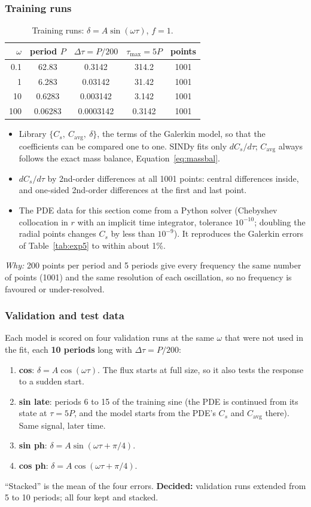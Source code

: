 \documentclass[11pt,a4paper]{article}
\newcommand{\why}{\textit{Why:} }
\newcommand{\decided}[1]{\textcolor{green!40!black}{\textbf{Decided:} #1}}
\newcommand{\avg}{\mathrm{avg}}
\begin{document}
\subsubsection{Training runs}
\begin{table}[H]\centering\small
\begin{tabular}{rcccc}\toprule
$\omega$ & period $P$ & $\Delta\tau=P/200$ & $\tau_{\max}=5P$ & points\\\midrule
0.1 & 62.83 & 0.3142 & 314.2 & 1001\\
1 & 6.283 & 0.03142 & 31.42 & 1001\\
10 & 0.6283 & 0.003142 & 3.142 & 1001\\
100 & 0.06283 & 0.0003142 & 0.3142 & 1001\\\bottomrule
\end{tabular}
\caption{Training runs: $\delta = A\sin(\omega\tau)$, $f=1$.}
\end{table}
\begin{itemize}
  \item Library $\{C_s,\ C_\avg,\ \delta\}$, the terms of the Galerkin model, so that the coefficients can be compared one to one. SINDy fits only $dC_s/d\tau$; $C_\avg$ always follows the exact mass balance, Equation~\eqref{eq:massbal}.
  \item $dC_s/d\tau$ by 2nd-order differences at all 1001 points: central differences inside, and one-sided 2nd-order differences at the first and last point.
  \item The PDE data for this section come from a Python solver (Chebyshev collocation in $r$ with an implicit time integrator, tolerance $10^{-10}$; doubling the radial points changes $C_s$ by less than $10^{-9}$). It reproduces the Galerkin errors of Table~\ref{tab:exp5} to within about 1\%.
\end{itemize}
\why 200 points per period and 5 periods give every frequency the same number of points (1001) and the same resolution of each oscillation, so no frequency is favoured or under-resolved.

\subsubsection{Validation and test data}
Each model is scored on four validation runs at the same $\omega$ that were not used in the fit, each \textbf{10 periods} long with $\Delta\tau=P/200$:
\begin{enumerate}
  \item \textbf{cos}: $\delta = A\cos(\omega\tau)$. The flux starts at full size, so it also tests the response to a sudden start.
  \item \textbf{sin late}: periods 6 to 15 of the training sine (the PDE is continued from its state at $\tau=5P$, and the model starts from the PDE's $C_s$ and $C_\avg$ there). Same signal, later time.
  \item \textbf{sin ph}: $\delta = A\sin(\omega\tau+\pi/4)$.
  \item \textbf{cos ph}: $\delta = A\cos(\omega\tau+\pi/4)$.
\end{enumerate}
``Stacked'' is the mean of the four errors.
\decided{validation runs extended from 5 to 10 periods; all four kept and stacked.}
\end{document}
